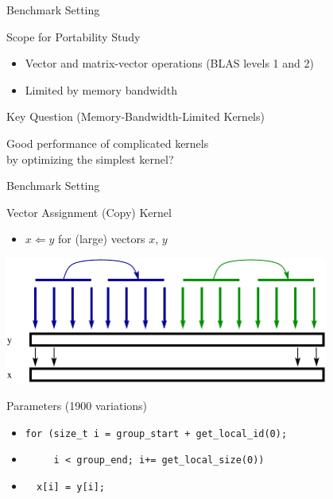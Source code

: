 

\begin{frame}{Benchmark Setting}

  \begin{block}{Scope for Portability Study}
    \begin{itemize}
     \item Vector and matrix-vector operations (BLAS levels 1 and 2)
     \item Limited by memory bandwidth
    \end{itemize}
  \end{block}

  \begin{block}{Key Question (Memory-Bandwidth-Limited Kernels)}
    \begin{center} \color{red} \LARGE
     Good performance of complicated kernels \\
     by optimizing the simplest kernel?
    \end{center}
  \end{block}

\end{frame}


\begin{frame}[fragile]{Benchmark Setting}
  \begin{block}{Vector Assignment (Copy) Kernel}
    \begin{itemize}
     \item $x \Leftarrow y$ for (large) vectors $x$, $y$
    \end{itemize}
  \end{block}

  \begin{center} \vspace*{0.30cm} \includegraphics[width=0.8\textwidth]{figures/copy-kernel-cpu-full} \end{center}
  
  \begin{block}{Parameters (1900 variations) }
   \begin{itemize}
     \item \texttt{for (size\_t i = group\_start + get\_local\_id(0);}
     \item \texttt{\ \ \ \ \ i < group\_end; i+= get\_local\_size(0)) }
     \item \texttt{\ \  x[i] = y[i];}
   \end{itemize}
  \end{block}
\end{frame}


